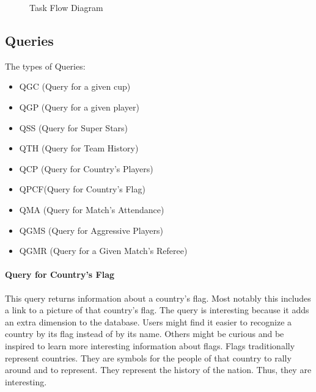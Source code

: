 \documentclass{article}
\begin{document}
\begin{figure}[ph]
	\caption{Task Flow Diagram}
	\label{taskflow2}
\end{figure}

\subsection{Queries}
The types of Queries:
\begin{itemize}
	\label{queries}
	\item QGC (Query for a given cup)
	\item QGP (Query for a given player)
	\item QSS (Query for Super Stars)
	\item QTH (Query for Team History)
	\item QCP (Query for Country's Players)
	\item QPCF(Query for Country's Flag)
	\item QMA (Query for Match's Attendance)
	\item QGMS (Query for Aggressive Players)
	\item QGMR (Query for a Given Match's Referee)
\end{itemize}

\paragraph{Query for Country's Flag}
This query returns information about a country's flag. Most notably this includes a link to a picture of that country's flag. The query is interesting because it adds an extra dimension to the database. Users might find it easier
to recognize a country by its flag instead of by its name. Others might be curious and be inspired to learn more interesting information about flags.
Flags traditionally represent countries. They are symbols for the people of that country to rally around and to represent. They represent the history of the nation. Thus, they are interesting.
\end{document}
